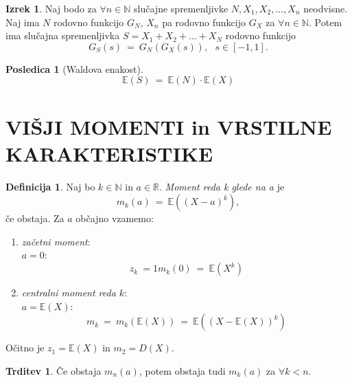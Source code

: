 \documentclass[11pt]{article}
\theoremstyle{definition}
\newtheorem{definicija}{Definicija}[section]
\theoremstyle{definition}
\newtheorem{trditev}{Trditev}[section]
\theoremstyle{definition}
\newtheorem{izrek}{Izrek}[section]
\newtheorem*{posledica}{Posledica}
\begin{document}
\begin{izrek}

Naj bodo za $\forall n \in \mathbb{N}$ slučajne spremenljivke $N, X_1, X_2, \ldots, X_n$ neodvisne. Naj ima $N$ rodovno funkcijo $G_N$, $X_n$ pa rodovno funkcijo $G_X$ za $\forall n \in \mathbb{N}$. Potem ima slučajna spremenljivka $S = X_1 + X_2 + \ldots + X_N$ rodovno funkcijo
$$G_S(s) ~=~ G_N(G_X(s)), ~~~s \in [-1, 1].$$ 

\end{izrek}
\vspace{0.5cm}

\begin{posledica}[Waldova enakost]

$$\mathbb{E}(S) ~=~ \mathbb{E}(N) \cdot \mathbb{E}(X)$$

\end{posledica}
\vspace{0.5cm}

\pagebreak


\section{VIŠJI MOMENTI in VRSTILNE \\KARAKTERISTIKE}
\vspace{0.5cm}

\begin{definicija}

Naj bo $k \in \mathbb{N}$ in $a \in \mathbb{R}$. \textit{Moment reda k glede na a} je
$$m_k(a) ~=~ \mathbb{E}((X-a)^k),$$
če obstaja. Za $a$ občajno vzamemo:
\begin{enumerate}
	\item \textit{začetni moment}: \\$a = 0$: $$z_k ~=1 m_k(0) ~=~ \mathbb{E}(X^k)$$
	\item \textit{centralni moment reda $k$}: \\$a = \mathbb{E}(X)$: $$m_k ~=~ m_k(\mathbb{E}(X)) ~=~ \mathbb{E}((X - \mathbb{E}(X))^k)$$
\end{enumerate}
Očitno je $z_1 = \mathbb{E}(X)$ in $m_2 = D(X)$.

\end{definicija}
\vspace{0.5cm}

\begin{trditev}

Če obstaja $m_n(a)$, potem obstaja tudi $m_k(a)$ za $\forall k < n$.

\end{trditev}
\vspace{0.5cm}
\end{document}
